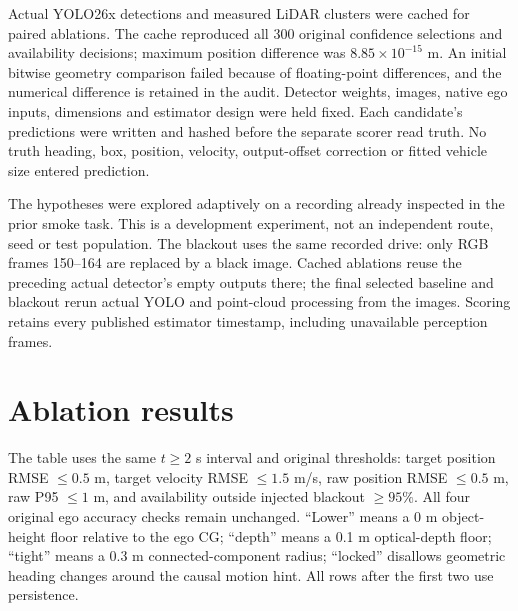 \documentclass[11pt]{article}
\begin{document}
Actual YOLO26x detections and measured LiDAR clusters were cached for paired
ablations. The cache reproduced all 300 original confidence selections and
availability decisions; maximum position difference was
$8.85\times10^{-15}$ m. An initial bitwise geometry comparison failed because
of floating-point differences, and the numerical difference is retained in
the audit. Detector weights, images, native ego inputs, dimensions and
estimator design were held fixed. Each candidate's predictions were written
and hashed before the separate scorer read truth. No truth heading, box,
position, velocity, output-offset correction or fitted vehicle size entered
prediction.

The hypotheses were explored adaptively on a recording already inspected in
the prior smoke task. This is a development experiment, not an independent
route, seed or test population. The blackout uses the same recorded drive:
only RGB frames 150--164 are replaced by a black image. Cached ablations
reuse the preceding actual detector's empty outputs there; the final selected
baseline and blackout rerun actual YOLO and point-cloud processing from the
images. Scoring retains every published estimator timestamp, including
unavailable perception frames.

\section{Ablation results}
The table uses the same $t\geq2$ s interval and original thresholds:
target position RMSE $\leq0.5$ m, target velocity RMSE $\leq1.5$ m/s,
raw position RMSE $\leq0.5$ m, raw P95 $\leq1$ m, and availability outside
injected blackout $\geq95\%$. All four original ego accuracy checks remain
unchanged. ``Lower'' means a 0 m object-height floor relative to the ego CG;
``depth'' means a 0.1 m optical-depth floor; ``tight'' means a 0.3 m
connected-component radius; ``locked'' disallows geometric heading changes
around the causal motion hint. All rows after the first two use persistence.
\end{document}
